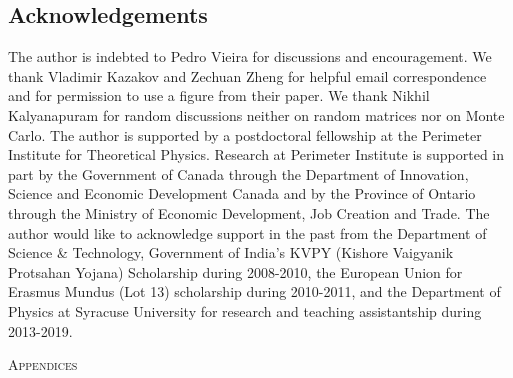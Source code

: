 \documentclass[letter,11pt]{article}
\begin{document}
\subsection*{Acknowledgements}
The author is indebted to Pedro Vieira
for discussions and encouragement. We thank Vladimir Kazakov 
and Zechuan Zheng for helpful email correspondence and for 
permission to use a figure from their paper. 
We thank Nikhil Kalyanapuram for random discussions neither on
random matrices nor on Monte Carlo. The author is supported by a 
postdoctoral fellowship at the Perimeter Institute for Theoretical Physics. 
Research at Perimeter Institute is supported in part by the Government of Canada through the Department of Innovation, 
Science and Economic Development Canada and by the Province of Ontario through 
the Ministry of Economic Development, Job Creation and Trade.
The author would like to acknowledge support in the past from 
the Department of Science \& Technology, Government of India's KVPY
(Kishore Vaigyanik Protsahan Yojana) Scholarship during 2008-2010, 
the European Union for Erasmus Mundus (Lot 13) scholarship during 2010-2011, 
and the Department of Physics at Syracuse University for research and teaching
assistantship during 2013-2019. 
\vspace{6mm}
\appendix
\begin{center} \large{\textsc{Appendices}}\end{center}
\end{document}
